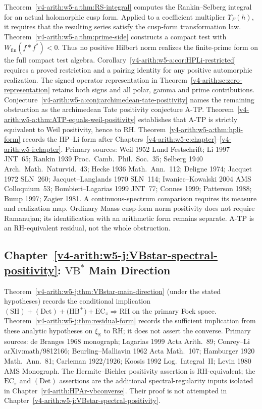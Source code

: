 Theorem~\ref{v4-arith:w5-a:thm:RS-integral} computes the Rankin--Selberg
integral for an actual holomorphic cusp form. Applied to a coefficient
multiplier \(\Upsilon_F(h)\), it requires that the resulting series
satisfy the cusp-form transformation law.
Theorem~\ref{v4-arith:w5-a:thm:prime-side} constructs a compact test with
\(W_{\mathrm{fin}}(f*f^*)<0\). Thus no positive Hilbert norm realizes
the finite-prime form on the full compact test algebra.
Corollary~\ref{v4-arith:w5-a:cor:HPLi-restricted} requires a proved restriction
and a pairing identity for any positive automorphic realization.
The signed operator representation in
Theorem~\ref{v4-arith:sc:zero-representation} retains both signs and all
polar, gamma and prime contributions.
Conjecture~\ref{v4-arith:w5-a:conj:archimedean-tate-positivity} names the
remaining obstruction as the archimedean Tate positivity conjecture
A-TP.
Theorem~\ref{v4-arith:w5-a:thm:ATP-equals-weil-positivity}
establishes that A-TP is strictly equivalent to Weil positivity, hence
to RH.
Theorem~\ref{v4-arith:w5-a:thm:hpli-form} records the HP--Li form
after Chapters~\ref{v4-arith:w5-e:chapter}--\ref{v4-arith:w5-i:chapter}.
Primary sources: Weil 1952 Lund Festschrift; Li 1997 JNT~65;
Rankin 1939 Proc.~Camb.~Phil.~Soc.~35;
Selberg 1940 Arch.~Math.~Naturvid.~43; Hecke 1936 Math.~Ann.~112;
Deligne 1974; Jacquet 1972 SLN~260; Jacquet--Langlands 1970 SLN~114;
Iwaniec--Kowalski 2004 AMS Colloquium~53; Bombieri--Lagarias 1999
JNT~77; Connes 1999; Patterson 1988; Bump 1997; Zagier 1981.
A continuous-spectrum comparison requires its measure and realization
map. Ordinary Maass cusp-form norm positivity does not require
Ramanujan; its identification with an arithmetic form remains separate.
A-TP is an RH-equivalent residual, not the whole obstruction.

\subsection{Chapter~\ref{v4-arith:w5-j:VBstar-spectral-positivity}: \(\mathrm{VB}^{*}\) Main Direction}
\label{v4-arith:w5-synth:ch58}

Theorem~\ref{v4-arith:w5-j:thm:VBstar-main-direction} (under the stated hypotheses)
records the conditional implication
\(\mathrm{(SH)}+\mathrm{(Det)}+\mathrm{(HB}^{+})+\mathrm{EC}_\pi
\Rightarrow \mathrm{RH}\) on the primary Fock space.
Theorem~\ref{v4-arith:w5-j:thm:residual-form} records the sufficient implication from these analytic hypotheses
on \(\xi_{\mathbb R}\) to RH; it does not assert the converse.
Primary sources: de Branges 1968 monograph; Lagarias 1999 Acta Arith.~89;
Conrey--Li arXiv:math/9812166; Beurling--Malliavin 1962
Acta Math.~107; Hamburger 1920 Math.~Ann.~81; Carleman 1922/1926;
Koosis 1992 Log.~Integral~II; Levin 1980 AMS Monograph.
The Hermite--Biehler positivity assertion is RH-equivalent; the
\(\mathrm{EC}_\pi\) and \(\mathrm{(Det)}\) assertions are the
additional spectral-regularity inputs isolated in Chapter~\ref{v4-arith:HPAr-vbconverse}. Their
proof is not attempted in Chapter~\ref{v4-arith:w5-j:VBstar-spectral-positivity}.

